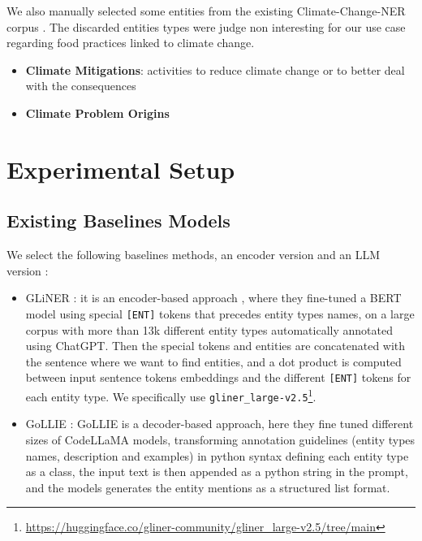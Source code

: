 \documentclass[11pt]{article}
\begin{document}
We also manually selected some entities from the existing Climate-Change-NER corpus \cite{bhattacharjeeINDUSEffectiveEfficient2024}. The discarded entities types were judge non interesting for our use case regarding food practices linked to climate change.

\begin{itemize}
    \item \textbf{Climate Mitigations}: activities to reduce climate change or to better deal with the consequences

    \item \textbf{Climate Problem Origins}
\end{itemize}


\section{Experimental Setup}

\subsection{Existing Baselines Models}

We select the following baselines methods, an encoder version and an LLM version : 
\begin{itemize}
    \item GLiNER \cite{zaratianaGLiNERGeneralistModel2023} : it is an encoder-based approach , where they fine-tuned a BERT model using special \texttt{[ENT]} tokens that precedes entity types names, on a large corpus with more than 13k different entity types automatically annotated using ChatGPT. Then the special tokens and entities are concatenated with the sentence where we want to find entities, and a dot product is computed between input sentence tokens embeddings and the different \texttt{[ENT]} tokens for each entity type. We specifically use \texttt{gliner\_large-v2.5}\footnote{\url{https://huggingface.co/gliner-community/gliner_large-v2.5/tree/main}}. 
    \item GoLLIE \cite{sainzGoLLIEAnnotationGuidelines2024} : GoLLIE is a decoder-based approach, here they fine tuned different sizes of CodeLLaMA models, transforming annotation guidelines (entity types names, description and examples) in python syntax defining each entity type as a class, the input text is then appended as a python string in the prompt, and the models generates the entity mentions as a structured list format.
\end{itemize}
\end{document}
